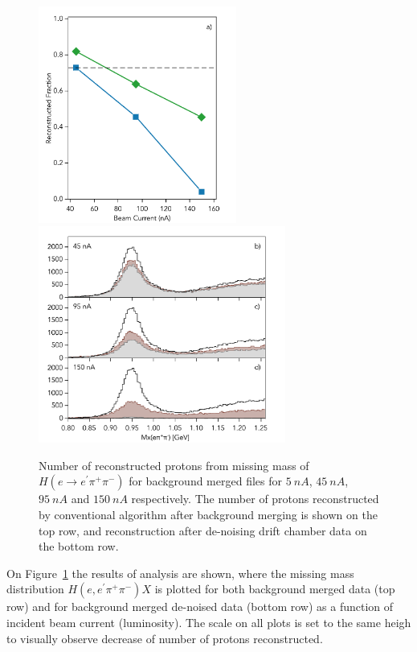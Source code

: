 \begin{figure}[!h]
\begin{center}
  \includegraphics[height=2.8in]{images/graph_mxepipi_dn.pdf}
 \includegraphics[height=2.8in]{images/plots_mxepipi_dn.pdf}
\caption {Number of reconstructed protons from missing mass of $H(e \rightarrow e^\prime \pi^+\pi^-)$ for background merged files for  $5~nA$, $45~nA$, $95~nA$ and $150~nA$ respectively. The number of protons reconstructed by conventional algorithm after background merging is shown on the top row, and reconstruction after  de-noising drift 
chamber data on the bottom row.}
 \label{physics::conv_dn}
 \end{center}
\end{figure}

On Figure~\ref{physics::conv_dn} the results of analysis are shown, where the missing mass distribution $H(e,e^\prime\pi^+\pi^-)X$ is plotted for both background merged data (top row) and for background merged de-noised data (bottom row) as a function of incident beam current (luminosity).  The scale on all plots is set to the same heigh to visually observe decrease of number of protons reconstructed. 

